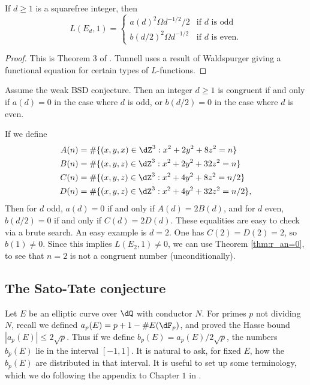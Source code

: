 \begin{theorem}[Tunnell]
If $d\geqslant 1$ is a squarefree integer, then 
\[
  L(E_d,1) = 
    \begin{cases}
      a(d)^2 \Omega d^{-1/2}/2 & \text{if $d$ is odd} \\
      b(d/2)^2 \Omega d^{-1/2} & \text{if $d$ is even} \text{.}
    \end{cases}
\]
\end{theorem}
\begin{proof}
This is Theorem 3 of \cite{tu83}. Tunnell uses a result of Waldspurger giving 
a functional equation for certain types of $L$-functions. 
\end{proof}

\begin{corollary}
Assume the weak BSD conjecture. Then an integer $d\geqslant 1$ is congruent if 
and only if $a(d)=0$ in the case where $d$ is odd, or $b(d/2)=0$ in the case 
where $d$ is even. 
\end{corollary}

If we define 
\begin{align*}
  A(n) &= \# \{(x,y,x)\in \dZ^3 : x^2 + 2 y^2 + 8 z^2 = n\} \\
  B(n) &= \# \{(x,y,z)\in \dZ^3 : x^2 + 2 y^2 + 32 z^2 = n \} \\
  C(n) &= \# \{(x,y,z)\in \dZ^3 : x^2+4 y^2 + 8 z^2 = n/2\} \\
  D(n) &= \# \{(x,y,z)\in \dZ^3 : x^2 + 4 y^2 + 32 z^2 = n/2\} \text{,}
\end{align*}
Then for $d$ odd, $a(d) =0$ if and only if $A(d) = 2 B(d)$, and for $d$ even, 
$b(d/2) = 0$ if and only if $C(d) = 2 D(d)$. These equalities are easy to 
check via a brute search. 
An easy example is $d=2$. One has $C(2) = D(2) = 2$, so $b(1)\ne 0$. Since 
this implies $L(E_2,1)\ne 0$, we can use Theorem \ref{thm:r_an=0}, to see 
that $n=2$ is not a congruent number (unconditionally). 





\subsection{The Sato-Tate conjecture}

Let $E$ be an elliptic curve over $\dQ$ with conductor $N$. For primes $p$ not 
dividing $N$, recall we defined $a_p(E) = p+1-\# E(\dF_p)$, and proved the 
Hasse bound $|a_p(E)| \leqslant 2\sqrt p$. Thus if we define 
$b_p(E) = a_p(E) /2\sqrt p$, the numbers $b_p(E)$ lie in the 
interval $[-1,1]$. It is natural to ask, for fixed $E$, how the $b_p(E)$ 
are distributed in that interval. It is useful to set up some terminology, 
which we do following the appendix to Chapter $1$ in \cite{se68}. 

